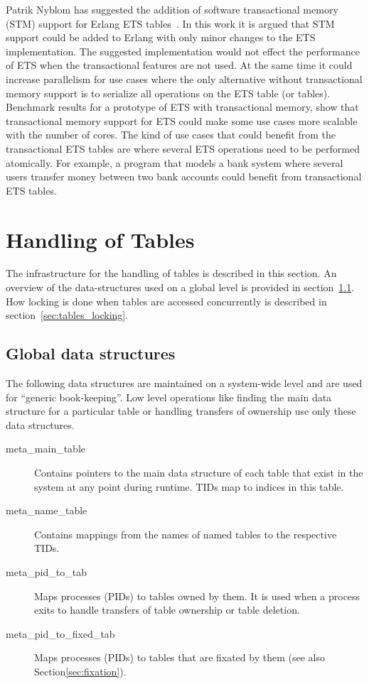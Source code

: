 \documentclass[aps,pre,preprint,nofootinbib]{revtex4}
\begin{document}
Patrik Nyblom has suggested the addition of software transactional memory (STM) support for Erlang ETS tables~\cite{PatrikErlangTrans}.
In this work it is argued that STM support could be added to Erlang with only minor changes to the ETS implementation.
The suggested implementation would not effect the performance of ETS when the transactional features are not used.
At the same time it could increase parallelism for use cases where the only alternative without transactional memory support is to serialize all operations on the ETS table (or tables).
Benchmark results for a prototype of ETS with transactional memory, show that transactional memory support for ETS could make some use cases more scalable with the number of cores.
The kind of use cases that could benefit from the transactional ETS tables are where several ETS operations need to be performed atomically.
For example, a program that models a bank system where several users transfer money between two bank accounts could benefit from transactional ETS tables.

\section{Handling of Tables}

The infrastructure for the handling of tables is described in this section.
An overview of the data-structures used on a global level is provided in section~\ref{sec:tables_overview}.
How locking is done when tables are accessed concurrently is described in section~\ref{sec:tables_locking}.

\subsection{Global data structures}
\label{sec:tables_overview}

The following data structures are maintained on a system-wide level and are used for ``generic book-keeping''.
Low level operations like finding the main data structure for a particular table or handling transfers of ownership use only these data structures.

\begin{description}
\item[meta\_main\_table]
  Contains pointers to the main data structure of each table that exist in the system at any point during runtime.
  TIDs map to indices in this table.
\item[meta\_name\_table]
  Contains mappings from the names of named tables to the respective TIDs.
\item[meta\_pid\_to\_tab]
  Maps processes (PIDs) to tables owned by them.
  It is used when a process exits to handle transfers of table ownership or table deletion.
\item[meta\_pid\_to\_fixed\_tab]
  Maps processes (PIDs) to tables that are fixated by them (see also Section\ref{sec:fixation}).
\end{description}
\end{document}
